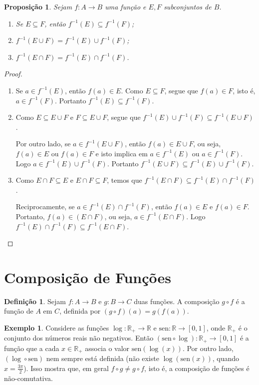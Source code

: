 \documentclass[a4paper,12pt]{monografia}
\theoremstyle{plain}
\newtheorem{proposition}{Proposição}[section]
\theoremstyle{definition}
\newtheorem{definition}{Definição}[section]
\newtheorem{example}{Exemplo}[section]
\theoremstyle{remark}
\newcommand{\R}{\mathbb{R}}
\begin{document}
\begin{proposition}\label{Img-inversa}
Sejam $f:A \rightarrow B$ uma função e $E, F$ subconjuntos de $B$.
\begin{enumerate}
    \item[(a)] Se $E \subseteq F$, então $f^{-1}(E)\subseteq f^{-1}(F)$;
    \item[(b)] $f^{-1}(E \cup F)=f^{-1}(E)\cup f^{-1}(F)$;
    \item[(c)] $f^{-1}(E \cap F)=f^{-1}(E)\cap f^{-1}(F)$.
\end{enumerate}
\end{proposition}
\begin{proof}\mbox{}
\begin{enumerate}
    \item[(a)] Se $a \in f^{-1}(E)$, então $f(a) \in E$.
    Como $E \subseteq F$, segue que $f(a) \in F$, isto é,
    $a \in f^{-1}(F)$. Portanto $f^{-1}(E)\subseteq f^{-1}(F)$.
    \item[(b)] Como $E \subseteq E \cup F$ e $F \subseteq E \cup
    F$, segue que $f^{-1}(E) \cup f^{-1}(F) \subseteq f^{-1}(E \cup
    F)$.

    Por outro lado, se $a \in f^{-1}(E \cup F)$, então $f(a) \in E
    \cup F$, ou seja, $f(a) \in E$ ou $f(a) \in F$ e isto implica em
    $a \in f^{-1}(E)$ ou $a \in f^{-1}(F)$. Logo $a \in
    f^{-1}(E)\cup f^{-1}(F)$. Portanto $f^{-1}(E \cup F)
    \subseteq f^{-1}(E)\cup f^{-1}(F)$.
    \item[(c)] Como $E \cap F \subseteq E$ e $E \cap F \subseteq
    F$, temos que $f^{-1}(E \cap F)\subseteq f^{-1}(E)\cap
    f^{-1}(F)$.

    Reciprocamente, se $a \in f^{-1}(E) \cap f^{-1}(F)$, então
    $f(a) \in E$ e $f(a) \in F$. Portanto, $f(a) \in (E \cap
    F)$, ou seja, $a \in f^{-1}(E \cap F)$. Logo $f^{-1}(E)
    \cap f^{-1}(F) \subseteq f^{-1}(E \cap F)$.
\end{enumerate}
\end{proof}

\section{Composição de Funções}
\begin{definition}
Sejam $f:A \rightarrow B$ e $g:B \rightarrow C$ duas funções. A
composição $g \circ f$ é a função de $A$ em $C$, definida por $(g
\circ f)(a)=g(f(a))$.
\end{definition}
\begin{example}\label{log-sen}
Considere as funções $\log :\R_+ \rightarrow \R$ e $\mbox{sen}:\R
\rightarrow [0,1]$, onde $\R_+$ é o conjunto dos números reais não
negativos. Então $(\mbox{sen} \circ \log):\R_+ \rightarrow [0,1]$
é a função que a cada $x \in \R_+$ associa o valor
$\mbox{sen}(\log(x))$. Por outro lado, $(\log \circ \mbox{sen})$
nem sempre está definida (não existe $\log( \mbox{sen}(x))$,
quando $x= \frac{3\pi}{2}$). Isso mostra que, em geral $f \circ g
\neq g \circ f$, isto é, a composição de funções é não-comutativa.
\end{example}
\end{document}
